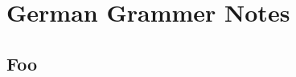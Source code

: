 \documentclass[12pt]{article}
\begin{document}
\section{German Grammer Notes  }



\subsection{Foo}
\end{document}
